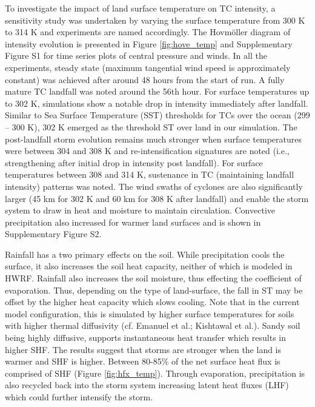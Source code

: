 \documentclass[fleqn,10pt]{wlscirep}
\begin{document}
To investigate the impact of land surface temperature on TC intensity, a sensitivity study was undertaken by varying the surface temperature from 300 K to 314 K and experiments are named accordingly. The Hovmöller diagram of intensity evolution is presented in Figure \ref{fig:hove_temp} and Supplementary Figure S1 for time series plots of central pressure and winds. In all the experiments, steady state (maximum tangential wind speed is approximately constant) was achieved after around 48 hours from the start of run. A fully mature TC landfall was noted around the 56th hour. For surface temperatures up to 302 K, simulations show a notable drop in intensity immediately after landfall. Similar to Sea Surface Temperature (SST) thresholds for TCs over the ocean (299 – 300 K), 302 K emerged as the threshold ST over land in our simulation. The post-landfall storm evolution remains much stronger when surface temperatures were between 304 and 308 K and re-intensification signatures are noted (i.e., strengthening after initial drop in intensity post landfall). For surface temperatures between 308 and 314 K, sustenance in TC (maintaining landfall intensity) patterns was noted. The wind swaths of cyclones are also significantly larger (45 km for 302 K and 60 km for 308 K after landfall) and enable the storm system to draw in heat and moisture to maintain circulation. Convective precipitation also increased for warmer land surfaces and is shown in Supplementary Figure S2. 

Rainfall has a two primary effects on the soil. While precipitation cools the surface, it also increases the soil heat capacity, neither of which is modeled in HWRF. Rainfall also increases the soil moisture, thus effecting the coefficient of evaporation. Thus, depending on the type of land-surface, the fall in ST may be offset by the higher heat capacity which slows cooling. Note that in the current model configuration, this is simulated by higher surface temperatures for soils with higher thermal diffusivity (cf. Emanuel et al.\cite{Emanuel2008}; Kishtawal et al.\cite{kishtawal2013}). Sandy soil being highly diffusive, supports instantaneous heat transfer which results in higher SHF. The results suggest that storms are stronger when the land is warmer and SHF is higher. Between 80-85\% of the net surface heat flux is comprised of SHF (Figure \ref{fig:hfx_temp}). Through evaporation, precipitation is also recycled back into the storm system increasing latent heat fluxes (LHF) which could further intensify the storm. 
\end{document}
